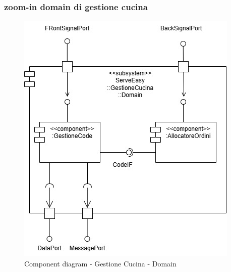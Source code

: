 \subsubsection{zoom-in domain di gestione cucina}
\begin{figure}[H]
	\centering
	\includegraphics[scale=0.5]{iterazione1/images/component_comanda_cucina-GestioneCucina__Domain.jpg}
	\caption{Component diagram - Gestione Cucina - Domain \label{fig:component_diagram_gestione_cucina_domain}}
\end{figure}

